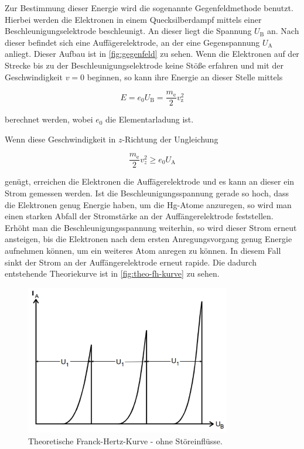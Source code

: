 Zur Bestimmung dieser Energie wird die sogenannte Gegenfeldmethode benutzt.
Hierbei werden die Elektronen in einem Quecksilberdampf mittels einer Beschleunigungselektrode beschleunigt. An dieser liegt die Spannung $U_\text{B}$ an.
Nach dieser befindet sich eine Auffägerelektrode, an der eine Gegenspannung $U_\text{A}$ anliegt. Dieser Aufbau ist in \autoref{fig:gegenfeld} zu sehen.
Wenn die Elektronen auf der Strecke bis zu der Beschleunigungselektrode keine Stöße erfahren und mit der Geschwindigkeit $v = 0$ beginnen, so kann ihre Energie an dieser Stelle mittels

\begin{equation}
    \label{eqn:eU}
    E = e_0 U_\text{B} = \frac{m_\text{e}}{2} v_\text{z}^2
\end{equation}

berechnet werden, wobei $e_0$ die Elementarladung ist.

Wenn diese Geschwindigkeit in $z$-Richtung der Ungleichung

\begin{equation}
    \label{eqn:min-vel}
    \frac{m_\text{e}}{2} v_z^2 \geq e_0 U_\text{A}
\end{equation}

genügt, erreichen die Elektronen die Auffägerelektrode und es kann an dieser ein Strom gemessen werden.
Ist die Beschleunigungsspannung gerade so hoch, dass die Elektronen genug Energie haben, 
um die Hg-Atome anzuregen, so wird man einen starken Abfall der Stromstärke an der Auffängerelektrode feststellen.
Erhöht man die Beschleunigungsspannung weiterhin, so wird dieser Strom erneut ansteigen, 
bis die Elektronen nach dem ersten Anregungsvorgang genug Energie aufnehmen können, um ein weiteres Atom anregen zu können.
In diesem Fall sinkt der Strom an der Auffängerelektrode erneut rapide.
Die dadurch entstehende Theoriekurve ist in \autoref{fig:theo-fh-kurve} zu sehen.

\begin{figure}
    \centering
    \includegraphics[width=0.8\textwidth]{content/franck-hertz-theorie.PNG}
    \caption{Theoretische Franck-Hertz-Kurve - ohne Störeinflüsse\cite{V601}.}
    \label{fig:theo-fh-kurve}
\end{figure}

